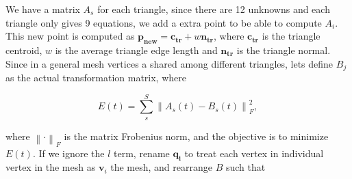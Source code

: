 \documentclass[12pt]{article}
\begin{document}
We have a matrix $A_{s}$ for each triangle, since there are 12 unknowns and each triangle only gives 9 equations, we add a extra point to be able to compute $A_i$.
This new point is computed as $\mathbf{p_{new}} = \mathbf{c_{tr}} + w\mathbf{n_{tr}}$, where $\mathbf{c_{tr}}$ is the triangle centroid, $w$ is the average triangle edge length and $\mathbf{n_{tr}}$ is the triangle normal. 
Since in a general mesh vertices a shared among different triangles, lets define $B_{j}$ as the actual transformation matrix, where

\begin{equation*}
E(t) = \sum_{s}^S \left \| A_s(t) - B_s(t) \right \|^2_F,
\end{equation*}

where $\left \| \cdot \right \|_F$ is the matrix Frobenius norm, and the objective is to minimize $E(t)$.
If we ignore the $l$ term, rename $\mathbf{q_i}$ to treat each vertex in individual vertex in the mesh as $\mathbf{v}_i$ the mesh, and rearrange $B$ such that
\end{document}
